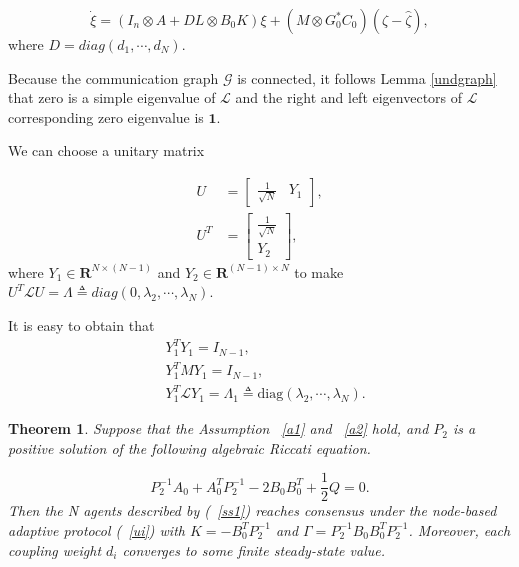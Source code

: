 \documentclass[english]{cccconf}
\newtheorem{theorem}{\bf Theorem}
\begin{document}
\begin{equation}
\label{xi}
\dot \xi = (I_n \otimes A + DL \otimes B_0 K)  \xi + (M \otimes G_0^{*} C_0)(\zeta - \hat \zeta),
\end{equation} where $D = diag(d_1, \cdots, d_N)$.

Because the communication graph $\mathcal G$ is connected, it follows Lemma \ref{undgraph} that zero is a simple eigenvalue of $\mathcal L$ and the right and left eigenvectors of $\mathcal L$ corresponding zero eigenvalue is $\mathbf 1$. 

We can choose a unitary matrix 

\begin{equation}
\begin{align}
U &= \begin{bmatrix} \frac{1}{\sqrt{N}}  & Y_1\end{bmatrix}, \\ U^T &= \begin{bmatrix} \frac{1}{\sqrt{N}}  \\ Y_2\end{bmatrix},
\end{align}
\end{equation} where $Y_1 \in \mathbf R^{N \times (N-1)}$ and $Y_2 \in \mathbf R^{(N-1) \times N}$ to make $U^T \mathcal L U = \Lambda \triangleq diag(0,\lambda_2,\cdots,\lambda_N)$.

It is easy to obtain that
\begin{equation}\label{uzhenxingzhi}
\begin{aligned}
 & Y_1^TY_1=I_{N-1},\\ &   Y_1^TMY_1=I_{N-1},\\
 & Y_1^T\mathcal LY_1=\Lambda_1\triangleq\mathrm{diag}(\lambda_2,\cdots,\lambda_N).
  \end{aligned}
\end{equation}
 


\begin{theorem}\label{th1}
Suppose that the Assumption ~\ref{a1} and ~\ref{a2} hold, and $P_2$ is a positive solution of the following algebraic Riccati equation.

\begin{equation}
\label{T2}
P^{-1}_{2} A_{0} + A_{0}^T P^{-1}_{2} - 2 B_{0} B_{0}^{T} + \frac{1}{2}Q = 0.
\end{equation}
Then the N agents described by (~\ref{ss1}) reaches consensus under the node-based adaptive protocol (~\ref{ui}) with $K=-B_0^T P_2^{-1}$ and $\Gamma = P_2^{-1}B_0 B_0^T P_2^{-1}$. Moreover, each coupling weight $d_i$ converges to some finite steady-state value.

 

\end{theorem}
\end{document}
